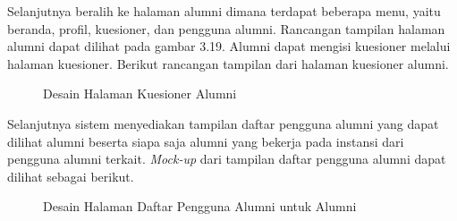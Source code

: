 Selanjutnya beralih ke halaman alumni dimana terdapat beberapa menu, yaitu beranda, profil, kuesioner, dan pengguna alumni. Rancangan tampilan halaman alumni dapat dilihat pada gambar 3.19. Alumni dapat mengisi kuesioner melalui halaman kuesioner. Berikut rancangan tampilan dari halaman kuesioner alumni.

\begin{figure}[H]
	\centering
	\caption{Desain Halaman Kuesioner Alumni}
	\label{alumni_beranda}
\end{figure}

Selanjutnya sistem menyediakan tampilan daftar pengguna alumni yang dapat dilihat alumni beserta siapa saja alumni yang bekerja pada instansi dari pengguna alumni terkait.\textit{ Mock-up} dari tampilan daftar pengguna alumni dapat dilihat sebagai berikut.

\begin{figure}[H]
	\centering
	\caption{Desain Halaman Daftar Pengguna Alumni untuk Alumni}
	\label{alumni_beranda}
\end{figure}

